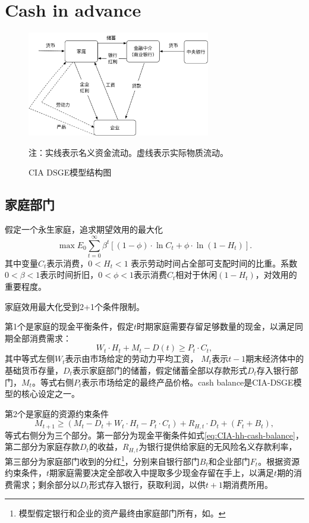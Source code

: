 \chapter{Cash in advance}
\label{sec:DSGECIA-intro}
\begin{figure}[htbp]
  \centering
  \includegraphics[width=8cm]{./Figures/20170324-CIA-outline}
 \caption{CIA DSGE模型结构图}
\label{fig:CIA-blueprint}

  \small{注：实线表示名义资金流动。虚线表示实际物质流动。}
\end{figure}

\section{家庭部门}
假定一个永生家庭，追求期望效用的最大化
\begin{equation}
  \label{eq:CIA-hh-max-util}
  \max%
  E_0 \sum_{t=0}^{\infty} \beta^t \left[ (1-\phi) \cdot \ln C_t + \phi \cdot \ln (1-H_t)\right].
\end{equation}
其中变量$ C_t$表示消费，$0<H_t<1$ 表示劳动时间占全部可支配时间的比重。系数$0<\beta<1$表示时间折旧，$0< \phi <1$表示消费$C_t$相对于休闲$(1-H_t)$，对效用的重要程度。

家庭效用最大化受到2+1个条件限制。

第1个是家庭的现金平衡条件，假定$t$时期家庭需要存留足够数量的现金，以满足同期全部消费需求：
\begin{equation}
  \label{eq:CIA-hh-cash-balance}
  W_t \cdot H_t + M_t - D(t) \ge P_t \cdot C_t,
\end{equation}
其中等式左侧$W_t$表示由市场给定的劳动力平均工资，%
$M_t$表示$t-1$期末经济体中的基础货币存量，$D_t$表示家庭部门的储蓄，假定储蓄全部以存款形式$D_t$存入银行部门，$M_t$。等式右侧$P_t$表示市场给定的最终产品价格。cash balance是CIA-DSGE模型的核心设定之一。

第2个是家庭的资源约束条件
\begin{equation}
  \label{eq:CIA-hh-rsource-constraint}
  M_{t+1} \ge \left(M_t - D_t + W_t \cdot H_t - P_t \cdot C_t\right) + R_{H,t} \cdot D_t + \left(F_t + B_t\right),
\end{equation}
等式右侧分为三个部分。第一部分为现金平衡条件如式\eqref{eq:CIA-hh-cash-balance}，第二部分为家庭存款$D_t$的收益，$R_{H,t}$为银行提供给家庭的无风险名义存款利率，第三部分为家庭部门收到的分红\footnote{模型假定银行和企业的资产最终由家庭部门所有，如\cite{Christiano:1992fz}。}，分别来自银行部门$B_t$和企业部门$F_t$。根据资源约束条件，$t$期家庭需要决定全部收入中提取多少现金存留在手上，以满足$t$期的消费需求；剩余部分以$D_t$形式存入银行，获取利润，以供$t+1$期消费所用。

